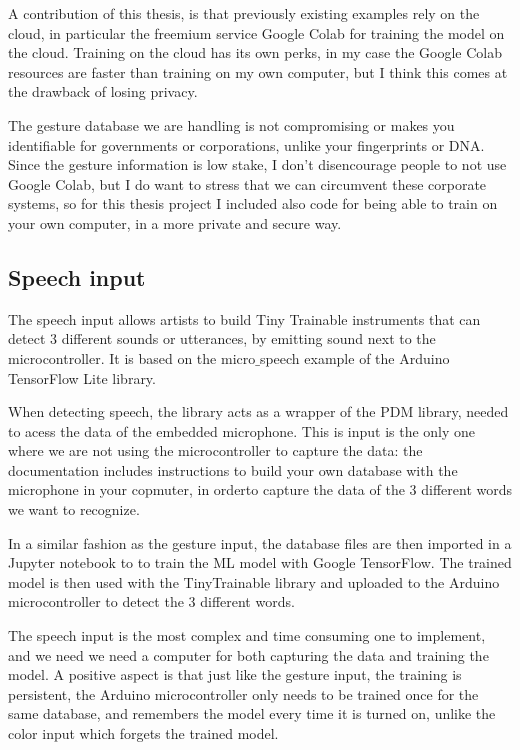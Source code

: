 A contribution of this thesis, is that previously existing examples rely on the cloud, in particular the freemium service Google Colab for training the model on the cloud. Training on the cloud has its own perks, in my case the Google Colab resources are faster than training on my own computer, but I think this comes at the drawback of losing privacy.

The gesture database we are handling is not compromising or makes you identifiable for governments or corporations, unlike your fingerprints or DNA. Since the gesture information is low stake, I don't disencourage people to not use Google Colab, but I do want to stress that we can circumvent these corporate systems, so for this thesis project I included also code for being able to train on your own computer, in a more private and secure way.

\subsection{Speech input}

The speech input allows artists to build Tiny Trainable instruments that can detect 3 different sounds or utterances, by emitting sound next to the microcontroller.  It is based on the micro$\_$speech example of the Arduino TensorFlow Lite library.

When detecting speech, the library acts as a wrapper of the PDM library, needed to acess the data of the embedded microphone. This is input is the only one where we are not using the microcontroller to capture the data: the documentation includes instructions to build your own database with the microphone in your copmuter, in orderto capture the data of the 3 different words we want to recognize. 

In a similar fashion as the gesture input, the database files are then imported in a Jupyter notebook to to train the \acrshort{ML} model with Google TensorFlow. The trained model is then used with the TinyTrainable library and uploaded to the Arduino microcontroller to detect the 3 different words.

The speech input is the most complex and time consuming one to implement, and we need we need a computer for both capturing the data and training the model. A positive aspect is that just like the gesture input, the training is persistent, the Arduino microcontroller only needs to be trained once for the same database, and remembers the model every time it is turned on, unlike the color input which forgets the trained model.

